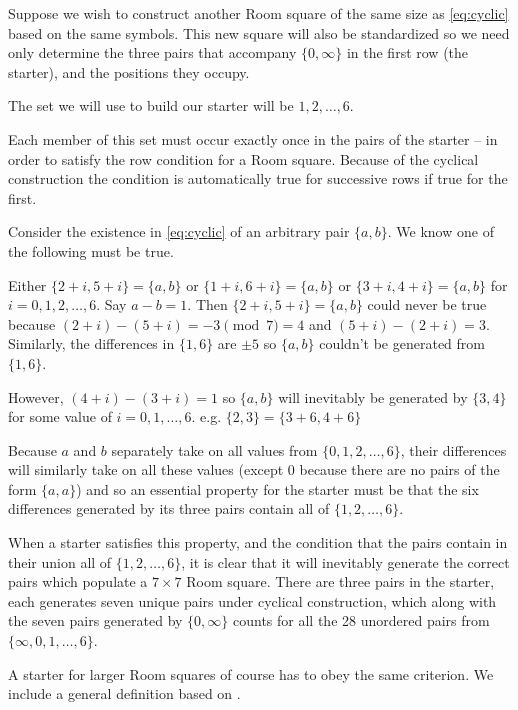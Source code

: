 Suppose we wish to construct another Room square of the same size as \eqref{eq:cyclic} based on the same symbols.
This new square will also be standardized so we need only determine the three pairs that accompany $\{0, \infty\}$ in the first row (the starter), and the positions they occupy.

The set we will use to build our starter will be ${1, 2, \ldots, 6}$.

Each member of this set must occur exactly once in the pairs of the starter – in order to satisfy the row condition for a Room square.
Because of the cyclical construction the condition is automatically true for successive rows if true
for the first.

Consider the existence in \eqref{eq:cyclic} of an arbitrary pair $\{a, b\}$.
We know one of the following must be true.

Either $\{2 + i, 5 + i\} = \{a, b\}$ or $\{1 + i, 6 + i\} = \{a, b\}$ or $\{3 + i, 4 + i\} = \{a, b\}$ for $i = 0, 1, 2, \ldots, 6$.
Say $a - b = 1$.
Then $\{2 + i, 5 + i\} = \{a, b\}$ could never be true because $(2 + i) - (5 + i) = -3\pmod 7 = 4$ and $(5 + i) - (2 + i) = 3$.
Similarly, the differences in $\{1, 6\}$ are $\pm 5$ so $\{a, b\}$ couldn't be generated from $\{1, 6\}$.

However, $(4 + i) - (3 + i) = 1$ so $\{a, b\}$ will inevitably be generated by $\{3, 4\}$ for some value of $i = 0, 1, \ldots, 6$.
e.g. $\{2, 3\} = \{3 + 6, 4 + 6\}$

Because $a$ and $b$ separately take on all values from $\{0, 1, 2, \ldots, 6\}$, their differences will similarly take on all these values (except 0 because there are no pairs of the form $\{a, a\}$) and so an essential property for the starter must be that the six differences generated by its three pairs contain all of $\{1, 2, \ldots, 6\}$.

When a starter satisfies this property, and the condition that the pairs contain in their union all of $\{1, 2, \ldots, 6\}$, it is clear that it will inevitably generate the correct pairs which populate a $7 \times 7$ Room square. 
There are three pairs in the starter, each generates seven unique pairs under cyclical construction, which along with the seven pairs generated by $\{0, \infty\}$ counts for all the 28 unordered pairs from $\{\infty, 0, 1, \ldots, 6\}$.

A starter for larger Room squares of course has to obey the same criterion.
We include a general definition based on
\cite{dinitzContemporaryDesignTheory1992}.

